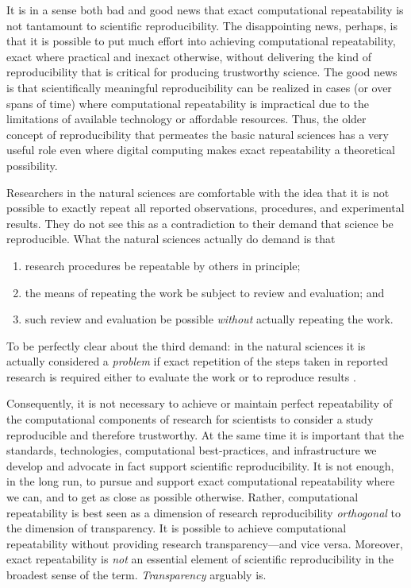 It is in a sense both bad and good news that exact computational repeatability is not tantamount to scientific reproducibility.
The disappointing news, perhaps, is that it is possible to put much effort into achieving computational repeatability,
	exact where practical and inexact otherwise,
	without delivering the kind of reproducibility that is critical for producing trustworthy science.
The good news is that scientifically meaningful reproducibility can be realized in cases (or over spans of time)
	where computational repeatability is impractical due to the limitations of available technology or affordable resources.
Thus, the older concept of reproducibility that permeates the basic natural sciences has a very
	useful role even where digital computing makes exact repeatability a theoretical possibility.

 Researchers in the natural sciences are comfortable with the idea that it is not possible to exactly
	repeat all reported observations, procedures, and experimental results.
They do not see this as a contradiction to their demand that science be reproducible.
What the natural sciences actually do demand is that 
\begin{enumerate}
\item research procedures be repeatable by others in principle;
\item the means of repeating the work be subject to review and
  evaluation; and 
\item such review and evaluation be possible \emph{without}
  actually repeating the work.
\end{enumerate}
To be perfectly clear about the third demand: in the natural sciences
it is actually considered a \emph{problem} if exact repetition of the
steps taken in reported research is required either to evaluate the
work or to reproduce results \cite{milkowski2018replicability}. 
                       

Consequently, it is not necessary to achieve or 
	maintain perfect repeatability of the computational components of research for scientists to 
	consider a study reproducible and therefore trustworthy.
At the same time it is important that the standards, technologies, 
	computational best-practices, and infrastructure we develop and advocate in fact support scientific reproducibility.
It is not enough, in the long run, to pursue and support exact computational repeatability where we can, 
	and to get as close as possible otherwise.
Rather, computational repeatability is best seen as a dimension of research reproducibility \emph{orthogonal} to 
	the dimension of transparency.
It is possible to achieve computational repeatability without providing research transparency---and vice versa.
Moreover, exact repeatability is \emph{not} an essential element of
scientific reproducibility in the broadest sense of the term. \emph{Transparency} arguably is.


